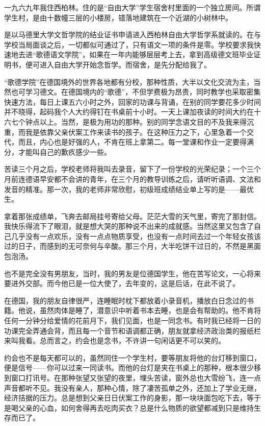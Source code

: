 \par 一九六九年我住西柏林。住的是“自由大学”学生宿舍村里面的一个独立房间。所谓学生村，是由十数幢三层的小楼房，错落地建筑在一个近湖的小树林中。
\par 是以马德里大学文哲学院的结业证书申请进入西柏林自由大学哲学系就读的。在与学校当局面谈之后，一切都似可通过了，只有语文一项的条件是零。学校要求我快速地去进“歌德语文学院”，如果在一年内能够层层考上去，拿到高级德文班毕业证明书，便可进入自由大学开始念哲学。而宿舍，是先分配给我了。
\par “歌德学院”在德国境外的世界各地都有分校，那种性质，大半以文化交流为主，当然也可学习德文。在德国境内的“歌德”，不但学费极为昂贵，同时教学也采取密集快速方法，每日上课五六小时之外，回家的功课与背诵，在别的同学要花多少时间并不晓得，起码我个人大约得钉在书桌前十小时。一天上课加夜读的时间大约在十六七个钟点以上。当然，是极为用功的那种。别的同学念语文目的不及我来得沉重，而我是依靠父亲伏案工作来读书的孩子。在这种压力之下，心里急着一个交代，而且，内心也是好强的人，不肯在班上拿第二。每一堂课和作业一定要得满分，才能叫自己的歉疚感少一些。
\par 苦读三个月之后，学校老师将我叫去录音，留下了一份学校的光荣纪录；一个三个月前连德语早安都不会讲的青年，在三个月的教导训练之后，请听听语调、文法和发音的精准。那一次，我的老师非常欣慰，初级班成绩结业单上写的是——最优生。
\par 拿着那张成绩单，飞奔去邮局挂号寄给父母。茫茫大雪的天气里，寄完了那封信。我快乐得流下了眼泪，就是想大哭的那种说不出来的成就感。当然这里又包含了自己几乎没有一点欢乐，没有一点点物质享受，也没有一点时间去过一个年轻女孩该过的日子，而感到的无可奈何与辛酸。那三个月，大半吃饼干过日的，不然是黑面包泡汤。
\par 也不是完全没有男朋友，当时，我的男友是位德国学生，他在苦写论文，一心将来要进外交部。而今他已是一位大使了，去年变的，这是后话，在此不说了。
\par 在德国，我的朋友自律很严，连睡眠时枕下都放着小录音机，播放白日念过的书籍。他说，虽然肉体是睡了，潜意识中听着书本去睡，也是会有帮助的。他不肯将任何一分钟分给爱情的花前月下，我们见面，也是一同念书。有时我已经将一日的功课完全弄通会背，而且每一个音节和语调都正确，朋友就拿经济政治类的报纸栏来叫我看。总而言之，约会也是念书，不许讲一句闲话更不可以笑的。
\par 约会也不是每天都可以的，虽然同住一个学生村，要等朋友将他的台灯移到窗口，便是信号——你可以过来一同读书。而他的台灯是夹在书桌上的那种，根本很少移到窗口打讯号。在那种张望又张望的夜里，埋头苦读，窗外总也大雪纷飞，连一点声音都听不见。我没有亲人，那种心情，除了凄苦孤单之外，还加上了学业无继，经济拮据的压力。总是想到父亲日日伏案工作的身影，那一块块面包吃下去，等于是喝父亲的心血，如何舍得再去吃肉买衣？总是什么物质的欲望都减到只是维持生存而已了。
